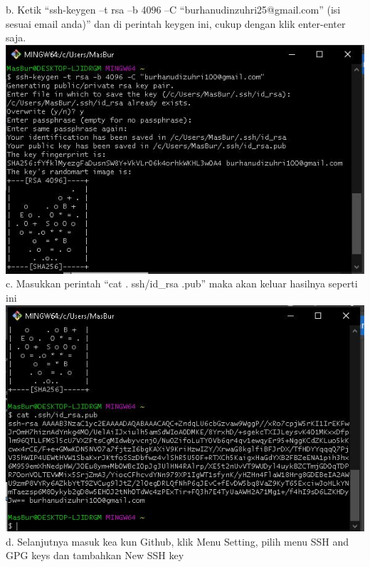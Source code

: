 \documentclass{article}
\begin{document}
\begin{enumerate}
                \newline
        	b. Ketik “ssh-keygen –t rsa –b 4096 –C “burhanudinzuhri25@gmail.com” (isi sesuai email anda)” dan  di perintah keygen ini, cukup dengan klik enter-enter saja.
                \newline
                \includegraphics[scale=0.5]{32.3b.jpg}
                \newline
        	c. Masukkan perintah “cat . ssh/id\_rsa .pub” maka akan keluar hasilnya seperti ini
                \newline
                \includegraphics[scale=0.5]{32.3c.jpg}
                \newline
        	d. Selanjutnya masuk kea kun Github, klik Menu Setting, pilih menu SSH and GPG keys dan tambahkan New SSH key
                \newline

\end{enumerate}
\end{document}
